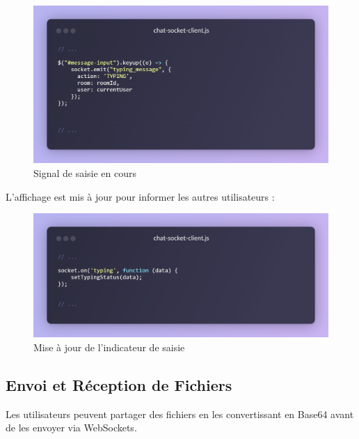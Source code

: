 \begin{figure}[H]
    \centering
    \includegraphics[width=15cm]{assets/annexes/snippet (18).png}
    \caption{ Signal de saisie en cours}
\end{figure}

L'affichage est mis à jour pour informer les autres utilisateurs :

\begin{figure}[H]
    \centering
    \includegraphics[width=15cm]{assets/annexes/snippet (19).png}
    \caption{ Mise à jour de l'indicateur de saisie}
\end{figure}

\subsection*{Envoi et Réception de Fichiers}

Les utilisateurs peuvent partager des fichiers en les convertissant en Base64 avant de les envoyer via WebSockets.

